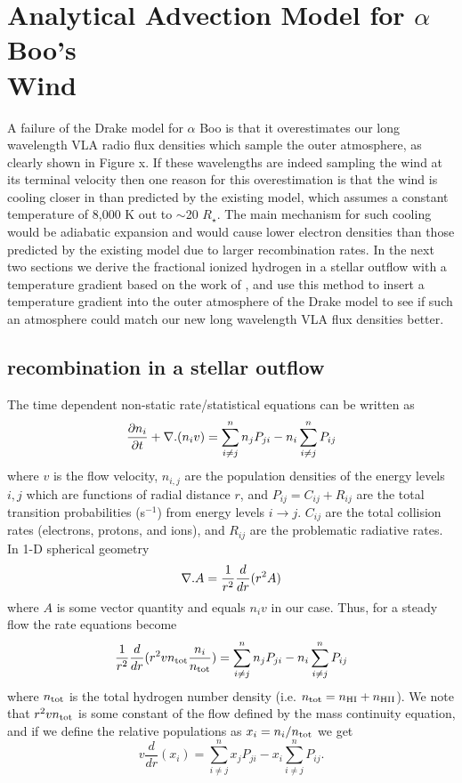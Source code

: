 \section{Analytical Advection Model for $\alpha$ Boo's \\ Wind}\label{sec:6.7}
A failure of the Drake model for $\alpha$ Boo is that it overestimates our long wavelength VLA radio flux densities which sample the outer atmosphere, as clearly shown in Figure x. If these wavelengths are indeed sampling the wind at its terminal velocity then one reason for this overestimation is that the wind is cooling closer in than predicted by the existing model, which assumes a constant temperature of 8,000 K out to $\sim$20 $R_{\star}$. The main mechanism for such cooling would be adiabatic expansion \citep{ogorman_2011} and would cause lower electron densities than those predicted by the existing model due to larger recombination rates. In the next two sections we derive the fractional ionized hydrogen in a stellar outflow with a temperature gradient based on the work of \cite{glassgold_1986}, and use this method to insert a temperature gradient into the outer atmosphere of the Drake model to see if such an atmosphere could match our new long wavelength VLA flux densities better.

\subsection{ recombination in a stellar outflow}\label{sec:6.6.1}

The time dependent non-static rate/statistical equations can be written as
\begin{equation}
\frac{\partial n_{i}}{\partial t}+{\bf \nabla }{.(n_{i}v)} = \sum_{i\neq j}^n n_{j}P_{ji} - n_{i}\sum_{i\neq j}^n P_{ij} 
\end{equation}
where $v$ is the flow velocity, $n_{i,j}$ are the population densities of the energy levels $i,j$ which are functions of radial distance $r$, and  $P_{ij}=C_{ij}+R_{ij}$ are the total transition probabilities (s$^{-1}$) from energy levels $i \rightarrow j$. $C_{ij}$ are the total collision rates (electrons, protons, and ions), and $R_{ij}$ are the problematic radiative rates. In 1-D spherical geometry
\begin{equation}
{\bf \nabla }{.A} = \frac{1}{r^2}\frac{d}{dr}(r^2 A)
\end{equation}
where $A$ is some vector quantity and equals $n_{i}v$ in our case. Thus, for a steady flow the rate equations become
\begin{equation}
\frac{1}{r^2}\frac{d}{dr}(r^2 vn_{\rm{tot}}\frac{n_{i}}{n_{\rm{tot}}}) = \sum_{i\neq j}^{n} n_{j}P_{ji} - n_{i}\sum_{i\neq j}^n P_{ij}
\end{equation}
where $n_{\rm{tot}}$ is the total hydrogen number density (i.e. $n_{\rm{tot}} = n_{\rm{HI}}+n_{\rm{HII}}$).
We note that $r^2 vn_{\rm{tot}}$ is some constant of the flow defined by the mass continuity equation, and if we define the relative populations as $x_{i}=n_{i}/n_{\rm{tot}}$ we get
\begin{equation}
v\frac{d}{dr}(x_{i}) = \sum_{i\neq j}^{n} x_{j}P_{ji} - x_{i}\sum_{i\neq j}^n P_{ij}.
\label{eq:eq6.9.1}
\end{equation}

